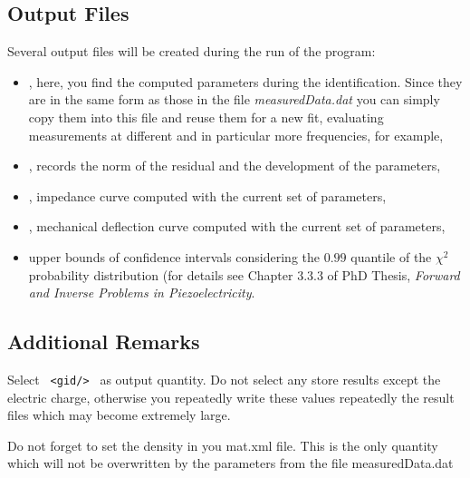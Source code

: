 \subsection{Output Files}
Several output files will be created during the run of the program:\\ \begin{itemize}
\item {}, here, you find the computed parameters during the identification. Since they are in the same form as those in the file {\em measuredData.dat} you can simply copy them into this file and reuse them for a new fit, evaluating measurements at different and in particular more frequencies, for example,
\item {}, records the norm of the residual and the development of the parameters,
\item {}, impedance curve computed with the current set of parameters, 
\item {}, mechanical deflection curve computed with the current set of parameters, 
\item {} upper bounds of confidence intervals considering the $0.99$ quantile of the $\chi^2$ probability distribution (for details see Chapter 3.3.3 of PhD Thesis, {\it Forward and Inverse Problems in Piezoelectricity}.
\end{itemize}

\subsection{Additional Remarks}
Select \verb! <gid/> ! as output quantity. Do not select any store results except the electric charge, otherwise you repeatedly write these values repeatedly the result files which may become extremely large.

Do not forget to set the density in you mat.xml file. This is the only quantity which will not be overwritten by the parameters from the file measuredData.dat

